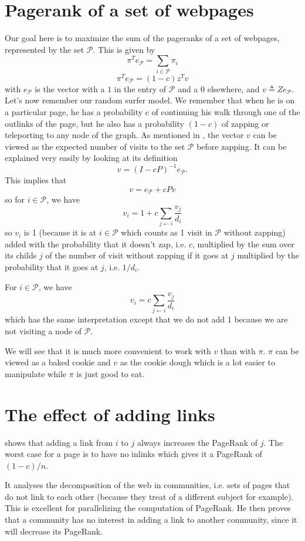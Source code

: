 \documentclass{article}
\newcommand{\1}{\mathbf{1}}
\theoremstyle{definition}
\begin{document}
\section{Pagerank of a set of webpages}
Our goal here is to maximize the sum of the pageranks of a set of webpages, represented by the set \(\mathcal{P}\). This is given by
\[\pi^Te_{\mathcal{P}} = \sum_{i\in \mathcal{P}}\pi_i\]
\[\pi^Te_{\mathcal{P}} = (1-c)z^Tv\]
with \(e_{\mathcal{P}}\) is the vector with a \(1\) in the entry of \(\mathcal{P}\) and a \(0\) elsewhere, and \(v \triangleq Ze_{\mathcal{P}}\).
Let's now remember our random surfer model. We remember that when he is on a particular page, he has a probability \(c\) of continuing his walk through one of the outlinks of the page, but he also has a probability \( (1-c)\) of zapping or teleporting to any node of the graph. As mentioned in \cite{de2008maximizing}, the vector \(v\) can be viewed as the expected number of visits to the set \(\mathcal{P}\) before zapping.
It can be explained very easily by looking at its definition
\[ v = (I - cP)^{-1} e_{\mathcal{P}}. \]
This implies that
\[ v = e_{\mathcal{P}} + cPv \]
so for \(i \in \mathcal{P}\), we have
\[ v_i = 1 + c \sum_{j \leftarrow i} \frac{v_j}{d_i} \]
so \(v_i\) is 1 (because it is at \(i \in \mathcal{P}\) which counts as 1 visit in \(\mathcal{P}\) without zapping)
added with the probability that it doesn't zap, i.e. \(c\), multiplied by the sum over its childs \(j\) of the number of visit without zapping if it goes at \(j\) multiplied
by the probability that it goes at \(j\), i.e. \(1/d_i\).

For \(i \in \mathcal{P}\), we have
\[ v_i = c \sum_{j \leftarrow i} \frac{v_j}{d_i} \]
which has the same interpretation except that we do not add 1 because we are not visiting a node of \(\mathcal{P}\).

We will see that it is much more convenient to work with \(v\) than with \(\pi\).
\(\pi\) can be viewed as a baked cookie and \(v\) as the cookie dough which is a lot easier to manipulate
while \(\pi\) is just good to eat.

\section{The effect of adding links}
\cite{avrachenkov2004decomposition} shows that adding a link
from \(i\) to \(j\) always increases the PageRank of \(j\).
The worst case for a page is to have no inlinks which gives it a PageRank of \((1-c)/n\).

It analyses the decomposition of the web in communities, i.e.
sets of pages that do not link to each other (because they treat of a different subject for example).
This is excellent for parallelizing the computation of PageRank.
He then proves that a community has no interest in adding a link to another community, since it will decrease its PageRank.
\end{document}
